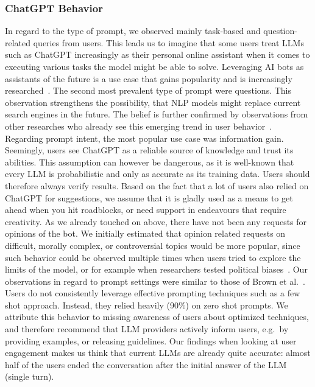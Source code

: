\subsubsection{ChatGPT Behavior}
In regard to the type of prompt, we observed mainly task-based and question-related queries from
users.
This leads us to imagine that some users treat LLMs such as ChatGPT increasingly as their
personal online assistant when it comes to executing various tasks the model might be able to solve.
Leveraging AI bots as assistants of the future is a use case that gains popularity and is
increasingly researched~\cite{eshghie_chatgpt_2023}.
The second most prevalent type of prompt were questions.
This observation strengthens the possibility, that NLP models might replace current search engines
in the future.
The belief is further confirmed by observations from other researches who already see this
emerging trend in user behavior~\cite{van_bulck_what_2023}.
Regarding prompt intent, the most popular use case was information gain.
Seemingly, users see ChatGPT as a reliable source of knowledge and trust its abilities.
This assumption can however be dangerous, as it is well-known that every LLM is probabilistic and
only as accurate as its training data.
Users should therefore always verify results.
Based on the fact that a lot of users also relied on ChatGPT for suggestions, we assume that it
is gladly used as a means to get ahead when you hit roadblocks, or need support in endeavours
that require creativity.
As we already touched on above, there have not been any requests for opinions of the bot.
We initially estimated that opinion related requests on difficult, morally complex, or
controversial topics would be more popular, since such behavior could be observed multiple times
when users tried to explore the limits of the model, or for example when researchers tested
political biases~\cite{rozado_political_2023}.
Our observations in regard to prompt settings were similar to those of Brown et al.~\cite{brown_language_2020}.
Users do not consistently leverage effective prompting techniques such as a few shot approach.
Instead, they relied heavily (90\%) on zero shot prompts.
We attribute this behavior to missing awareness of users about optimized techniques, and
therefore recommend that LLM providers actively inform users, e.g.\ by
providing examples, or releasing guidelines.
Our findings when looking at user engagement makes us think that current LLMs are already
quite accurate: almost half of the users ended the conversation after the initial answer of
the LLM (single turn).
